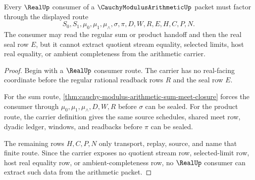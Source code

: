 \begin{theorem}
\label{thm:cauchy-modulus-arithmetic-real-consumer-boundary}
Every $\RealUp$ consumer of a $\CauchyModulusArithmeticUp$ packet must factor
through the displayed route
$$
S_0,S_1,\mu_0,\mu_1,\mu_{\wedge},\sigma,\pi,D,W,R,E,H,C,P,N.
$$
The consumer may read the regular sum or product handoff and then the real
seal row $E$, but it cannot extract quotient stream equality, selected limits,
host real equality, or ambient completeness from the arithmetic carrier.
\end{theorem}
\begin{proof}
Begin with a $\RealUp$ consumer route. The carrier has no real-facing
coordinate before the regular rational readback rows $R$ and the seal row $E$.

For the sum route, \autoref{thm:cauchy-modulus-arithmetic-sum-meet-closure}
forces the consumer through $\mu_0,\mu_1,\mu_{\wedge},D,W,R$ before $\sigma$
can be sealed. For the product route, the carrier definition gives the same
source schedules, shared meet row, dyadic ledger, windows, and readbacks before
$\pi$ can be sealed.

The remaining rows $H,C,P,N$ only transport, replay, source, and name that
finite route. Since the carrier exposes no quotient stream row, selected-limit
row, host real equality row, or ambient-completeness row, no $\RealUp$ consumer
can extract such data from the arithmetic packet.
\end{proof}

